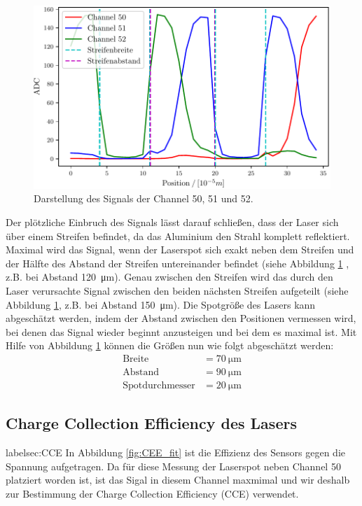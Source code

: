 \begin{figure}[H]
  \centering
  \includegraphics{build/Laserscan_Pos.pdf}
  \caption{Darstellung des Signals der Channel 50, 51 und 52.}
  \label{fig:laserscan_pos}
\end{figure}

Der plötzliche Einbruch des Signals lässt darauf schließen, dass der Laser sich über einem Streifen befindet, da das Aluminium den Strahl komplett reflektiert. Maximal wird das Signal, wenn der Laserspot sich exakt neben dem Streifen und der Hälfte des Abstand der Streifen untereinander befindet (siehe Abbildung \ref{fig:laserscan_pos} , z.B. bei Abstand \SI{120}{\micro\meter}). Genau zwischen den Streifen wird das durch den Laser verursachte Signal zwischen den beiden nächsten Streifen aufgeteilt (siehe Abbildung \ref{fig:laserscan_pos}, z.B. bei Abstand \SI{150}{\micro\meter}). Die Spotgröße des Lasers kann abgeschätzt werden, indem der Abstand zwischen den Positionen vermessen wird, bei denen das Signal wieder beginnt anzusteigen und bei dem es maximal ist. Mit Hilfe von Abbildung \ref{fig:laserscan_pos} können die Größen nun wie folgt abgeschätzt werden:
\begin{align}
	\text{Breite} &= \SI{70}{\micro\meter}\\
	\text{Abstand} &= \SI{90}{\micro\meter}\\
	\text{Spotdurchmesser} &= \SI{20}{\micro\meter}
\end{align}

\subsection{Charge Collection Efficiency des Lasers}
label{sec:CCE}
In Abbildung \ref{fig:CEE_fit} ist die Effizienz des Sensors gegen die Spannung aufgetragen. Da für diese Messung der Laserspot neben Channel 50 platziert worden ist, ist das Sigal in diesem Channel maxmimal und wir deshalb zur Bestimmung der Charge Collection Efficiency (CCE) verwendet. 

